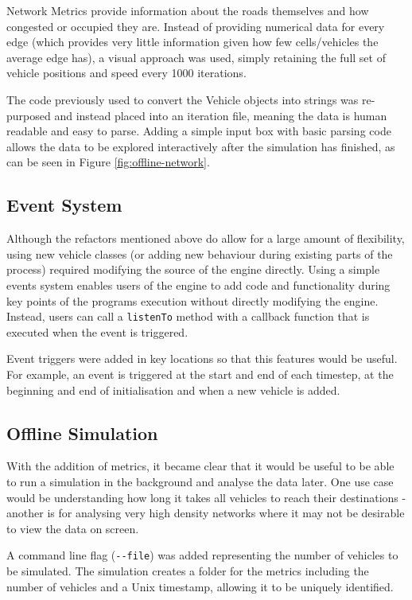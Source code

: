 \documentclass[ %
                    author={Alexander Hill},
                supervisor={Dr. Benjamin Sach},
                    degree={MEng},
                     title={MARMOSET},
                  subtitle={Multi-Agent Route Management using Online Simulation for Efficient Transportation},
                      type={research},
                      year={2016} ]{dissertation}
\begin{document}
Network Metrics provide information about the roads themselves and how congested
or occupied they are. Instead of providing numerical data for every edge (which
provides very little information given how few cells/vehicles the average edge
has), a visual approach was used, simply retaining the full set of vehicle
positions and speed every 1000 iterations.

The code previously used to convert the Vehicle objects into strings was
re-purposed and instead placed into an iteration file, meaning the data is human
readable and easy to parse. Adding a simple input box with basic parsing code
allows the data to be explored interactively after the simulation has finished,
as can be seen in Figure \ref{fig:offline-network}.

\subsection{Event System}

Although the refactors mentioned above do allow for a large amount of
flexibility, using new vehicle classes (or adding new behaviour during existing
parts of the process) required modifying the source of the engine directly.
Using a simple events system enables users of the engine to add code and
functionality during key points of the programs execution without directly
modifying the engine. Instead, users can call a \texttt{listenTo} method with a
callback function that is executed when the event is triggered.

Event triggers were added in key locations so that this features would be
useful. For example, an event is triggered at the start and end of each
timestep, at the beginning and end of initialisation and when a new vehicle is
added.

\subsection{Offline Simulation}

With the addition of metrics, it became clear that it would be useful to be able
to run a simulation in the background and analyse the data later. One use case
would be understanding how long it takes all vehicles to reach their
destinations - another is for analysing very high density networks where it may
not be desirable to view the data on screen.

A command line flag (\texttt{-{}-file}) was added representing the number of
vehicles to be simulated. The simulation creates a folder for the metrics
including the number of vehicles and a Unix timestamp, allowing it to be
uniquely identified.
\end{document}
